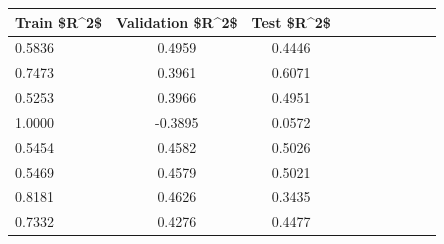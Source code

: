 \begin{tabular}{lccccccccc}
\toprule
Train \$R\textasciicircum 2\$ & Validation \$R\textasciicircum 2\$ & Test \$R\textasciicircum 2\$ \\
\midrule
0.5836 & 0.4959 & 0.4446 \\
0.7473 & 0.3961 & 0.6071 \\
0.5253 & 0.3966 & 0.4951 \\
1.0000 & -0.3895 & 0.0572 \\
0.5454 & 0.4582 & 0.5026 \\
0.5469 & 0.4579 & 0.5021 \\
0.8181 & 0.4626 & 0.3435 \\
0.7332 & 0.4276 & 0.4477 \\
\bottomrule
\end{tabular}
